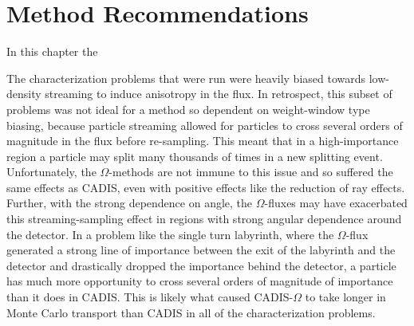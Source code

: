 \section{Method Recommendations}
\label{sec:method_recs}


In this chapter the




The characterization problems that were run were heavily biased towards
low-density streaming to induce anisotropy in the flux. In retrospect, this subset of
problems was not ideal for a method so dependent on weight-window type biasing,
because particle streaming allowed for particles to cross several orders of
magnitude in the flux before re-sampling. This meant that in a high-importance
region a particle may split many thousands of times in a new splitting event.
Unfortunately, the $\Omega$-methods are not immune to this issue and so suffered
the same effects as CADIS, even with positive effects like the reduction of ray
effects. Further, with the strong dependence on angle, the $\Omega$-fluxes may
have exacerbated this streaming-sampling effect in regions with strong angular
dependence around the detector. In a problem like the single turn labyrinth,
where the $\Omega$-flux generated a strong line of importance between the exit
of the labyrinth and the detector and drastically dropped the importance behind
the detector, a particle has much more opportunity to cross several orders of
magnitude of importance than it does in CADIS. This is likely what caused
CADIS-$\Omega$ to take longer in Monte Carlo transport than CADIS in all of the
characterization problems.

